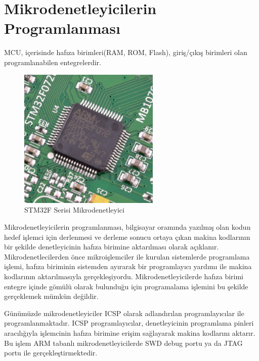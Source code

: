 \chapter{Mikrodenetleyicilerin Programlanması}

\acrfull{MCU}, içerisinde hafıza birimleri(RAM, ROM, Flash), giriş/çıkış birimleri olan programlanabilen entegrelerdir.

\begin{figure}[h]
\centering
\includegraphics[width=0.6\textwidth]{gorseller/mcu}
\caption{STM32F Serisi Mikrodenetleyici}\label{fig:mcu}
\end{figure}

Mikrodenetleyicilerin programlanması, bilgisayar oramında yazılmış olan kodun hedef işlemci için derlenmesi ve derleme sonucu ortaya çıkan makina kodlarının bir şekilde denetleyicinin hafıza birimine aktarılması olarak açıklanır. Mikrodenetlecilerden önce mikroişlemciler ile kurulan sistemlerde programlama işlemi, hafıza biriminin sistemden ayırarak bir programlayıcı yardımı ile makina kodlarının aktarılmasıyla gerçekleşiyordu. Mikrodenetleyicilerde hafıza birimi entegre içinde gömülü olarak bulunduğu için programalama işlemini bu şekilde gerçeklemek mümkün değildir.

Günümüzde mikrodenetleyiciler \acrfull{ICSP} olarak adlandırılan programlayıcılar ile programlanmaktadır. \acrshort{ICSP} programlayıcılar, denetleyicinin programlama pinleri aracılığıyla işlemcinin hafıza birimine erişim sağlayarak makina kodlarını aktarır. Bu işlem ARM tabanlı mikrodenetleyicilerde \acrfull{SWD} debug portu ya da JTAG portu ile gerçekleştirmektedir.
